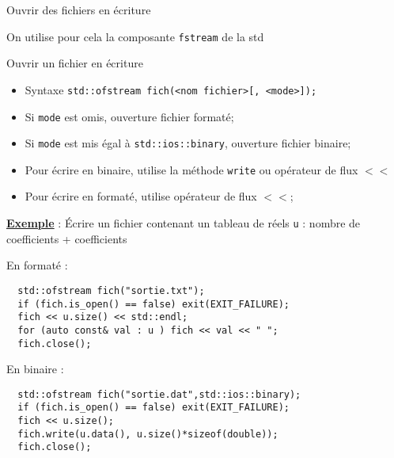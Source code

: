 \documentclass[compress,10pt,aspectratio=169]{beamer}
\begin{document}
  \begin{frame}[fragile]{Ouvrir des fichiers en écriture}
    \scriptsize
  
    On utilise pour cela la composante \texttt{fstream} de la std
  
  \begin{block}{\small Ouvrir un fichier en écriture}
  \begin{itemize}
  \item Syntaxe \texttt{std::ofstream fich(<nom fichier>[, <mode>]);}
  \item Si \texttt{mode} est omis, ouverture fichier formaté;
  \item Si \texttt{mode} est mis égal à \texttt{std::ios::binary}, ouverture fichier binaire;
  \item Pour écrire en binaire, utilise la méthode \texttt{write} ou opérateur de flux $<<$
  \item Pour écrire en formaté, utilise opérateur de flux $<<$;
  \end{itemize}
  \end{block}
  
  \underline{\textbf{Exemple}} : \'Ecrire un fichier contenant un tableau de réels \texttt{u} : nombre de coefficients + coefficients
  \begin{multicols}{2}
  En formaté :
  \begin{verbatim}
  std::ofstream fich("sortie.txt");
  if (fich.is_open() == false) exit(EXIT_FAILURE);
  fich << u.size() << std::endl;
  for (auto const& val : u ) fich << val << " ";
  fich.close();
  \end{verbatim}
  \columnbreak
  En binaire :
  \begin{verbatim}
  std::ofstream fich("sortie.dat",std::ios::binary);
  if (fich.is_open() == false) exit(EXIT_FAILURE);
  fich << u.size();
  fich.write(u.data(), u.size()*sizeof(double));
  fich.close();
  \end{verbatim}
  \end{multicols}
  \end{frame}
  
\end{document}
